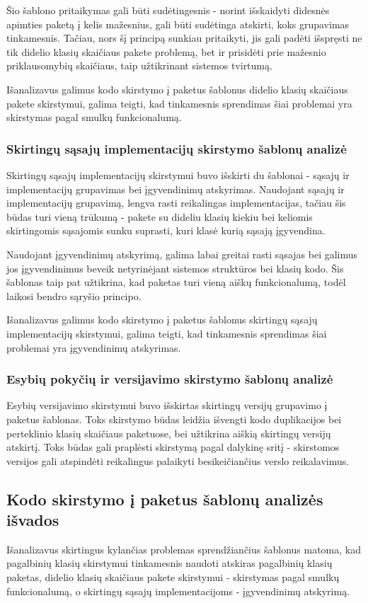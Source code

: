 Šio šablono pritaikymas gali būti sudėtingesnis - norint išskaidyti didesnės apimties paketą į kelis mažesnius, gali būti
sudėtinga atskirti, koks grupavimas tinkamesnis.
Tačiau, nors šį principą sunkiau pritaikyti, jis gali padėti išspręsti ne tik didelio klasių skaičiaus pakete problemą,
bet ir prisidėti prie mažesnio priklausomybių skaičiaus, taip užtikrinant sistemos tvirtumą.

Išanalizavus galimus kodo skirstymo į paketus šablonus didelio klasių skaičiaus pakete skirstymui, galima teigti, kad tinkamesnis sprendimas šiai
problemai yra skirstymas pagal smulkų funkcionalumą.


\subsubsection{Skirtingų sąsajų implementacijų skirstymo šablonų analizė}
Skirtingų sąsajų implementacijų skirstymui buvo išskirti du šablonai - sąsajų ir implementacijų grupavimas bei
įgyvendinimų atskyrimas.
Naudojant sąsajų ir implementacijų grupavimą, lengva rasti reikalingas implementacijas, tačiau šis būdas
turi vieną trūkumą - pakete su dideliu klasių kiekiu bei keliomis skirtingomis sąsajomis sunku suprasti, kuri klasė kurią sąsają įgyvendina.

Naudojant įgyvendinimų atskyrimą, galima labai greitai rasti sąsajas bei galimus jos įgyvendinimus beveik netyrinėjant sistemos struktūros bei klasių kodo.
Šis šablonas taip pat užtikrina, kad paketas turi vieną aiškų funkcionalumą, todėl laikosi bendro sąryšio principo.

Išanalizavus galimus kodo skirstymo į paketus šablonus skirtingų sąsajų implementacijų skirstymui, galima teigti, kad tinkamesnis sprendimas šiai
problemai yra įgyvendinimų atskyrimas.

\subsubsection{Esybių pokyčių ir versijavimo skirstymo šablonų analizė}
Esybių versijavimo skirstymui buvo išskirtas skirtingų versijų grupavimo į paketus šablonas.
Toks skirstymo būdas leidžia išvengti kodo duplikacijos bei perteklinio klasių skaičiaus paketuose, bei užtikrina aiškią skirtingų versijų
atskirtį. Toks būdas gali praplėsti skirstymą pagal dalykinę sritį - skirstomos versijos gali atspindėti reikalingus
palaikyti besikeičiančius verslo reikalavimus.

\subsection{Kodo skirstymo į paketus šablonų analizės išvados}
Išanalizavus skirtingus kylančias problemas sprendžiančius šablonus matoma, kad
pagalbinių klasių skirstymui tinkamesnis naudoti atskiras pagalbinių klasių paketas,
didelio klasių skaičiaus pakete skirstymui - skirstymas pagal smulkų funkcionalumą,
o skirtingų sąsajų implementacijoms - įgyvendinimų atskyrimą.

